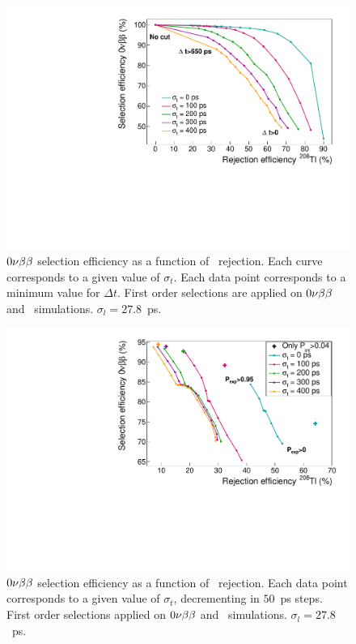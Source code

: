\begin{figure}[!h]
  \centering
  \includegraphics[width=13cm]{timedifference/fig_timediff/compare_sigma_cut_delta_t.pdf}
  \caption{$0\nu\beta\beta$ selection efficiency as a function of \Tl\ rejection.
    Each curve corresponds to a given value of $\sigma_{t}$.
    Each data point corresponds to a minimum value for $\Delta t$.
    First order selections are applied on $0\nu\beta\beta$ and \Tl\ simulations.
    $\sigma_{l}=27.8$~ps.
    \label{fig:eff_cut_delta_t_sigma}}
\end{figure}



\begin{figure}[!h]
  \centering
  \includegraphics[width=13cm]{timedifference/fig_timediff/compare_sigma_cut_proba.pdf}
  \caption{$0\nu\beta\beta$ selection efficiency as a function of \Tl\ rejection.
    Each data point corresponds to a given value of $\sigma_{t}$, decrementing in $50$~ps steps.
    First order selections applied on $0\nu\beta\beta$ and \Tl\ simulations.
    $\sigma_{l}=27.8$~ps.
    \label{fig:eff_cut_proba_sigma}}
\end{figure}




